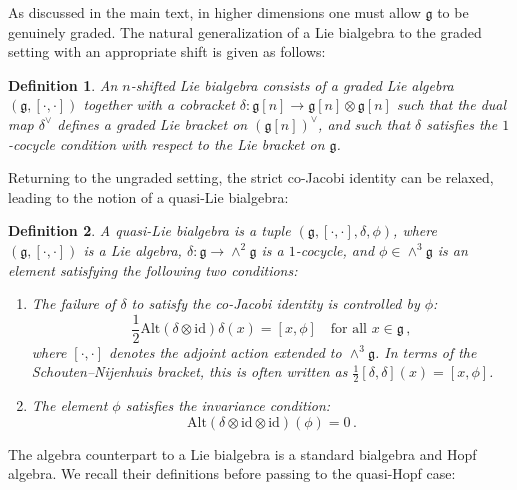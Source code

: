 \documentclass[11pt]{article}
\numberwithin{equation}{section}
\newtheorem{definition}{Definition}[section]
\begin{document}
As discussed in the main text, in higher dimensions one must allow $\mathfrak{g}$ to be genuinely graded. The natural generalization of a Lie bialgebra to the graded setting with an appropriate shift is given as follows:

\begin{definition}
An \emph{$n$-shifted Lie bialgebra} consists of a graded Lie algebra $(\mathfrak{g}, [\cdot, \cdot])$ together with a cobracket $\delta: \mathfrak{g}[n] \to \mathfrak{g}[n]\otimes \mathfrak{g}[n]$ such that the dual map $\delta^\vee$ defines a graded Lie bracket on $(\mathfrak{g}[n])^{\vee}$, and such that $\delta$ satisfies the $1$-cocycle condition with respect to the Lie bracket on $\mathfrak{g}$.
\end{definition}

Returning to the ungraded setting, the strict co-Jacobi identity can be relaxed, leading to the notion of a quasi-Lie bialgebra:

\begin{definition}
A \emph{quasi-Lie bialgebra} is a tuple $(\mathfrak{g}, [\cdot, \cdot], \delta, \phi)$, where $(\mathfrak{g}, [\cdot, \cdot])$ is a Lie algebra, $\delta: \mathfrak{g} \to \wedge^2\mathfrak{g}$ is a $1$-cocycle, and $\phi \in \wedge^3 \mathfrak{g}$ is an element satisfying the following two conditions:
\begin{enumerate}
    \item The failure of $\delta$ to satisfy the co-Jacobi identity is controlled by $\phi$:
    \begin{equation}
        \frac{1}{2}\mathrm{Alt}(\delta \otimes \mathrm{id})\delta(x) = [x, \phi] \quad \text{for all } x \in \mathfrak{g}\,,
    \end{equation}
    where $[\cdot, \cdot]$ denotes the adjoint action extended to $\wedge^3 \mathfrak{g}$. In terms of the Schouten--Nijenhuis bracket, this is often written as $\frac{1}{2}[\delta, \delta](x) = [x, \phi]$.
    \item The element $\phi$ satisfies the invariance condition:
    \begin{equation}
        \mathrm{Alt}(\delta \otimes \mathrm{id} \otimes \mathrm{id})(\phi) = 0\,.
    \end{equation}
\end{enumerate}
\end{definition}

The algebra counterpart to a Lie bialgebra is a standard bialgebra and Hopf algebra. We recall their definitions before passing to the quasi-Hopf case:
\end{document}
